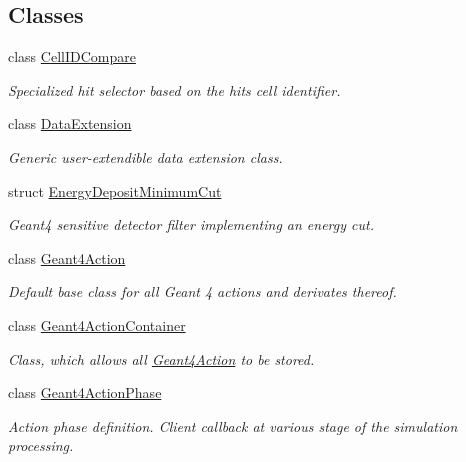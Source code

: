 \subsection*{Classes}
\begin{DoxyCompactItemize}
\item 
class \hyperlink{class_d_d4hep_1_1_simulation_1_1_cell_i_d_compare}{Cell\+I\+D\+Compare}
\begin{DoxyCompactList}\small\item\em Specialized hit selector based on the hit\textquotesingle{}s cell identifier. \end{DoxyCompactList}\item 
class \hyperlink{class_d_d4hep_1_1_simulation_1_1_data_extension}{Data\+Extension}
\begin{DoxyCompactList}\small\item\em Generic user-\/extendible data extension class. \end{DoxyCompactList}\item 
struct \hyperlink{struct_d_d4hep_1_1_simulation_1_1_energy_deposit_minimum_cut}{Energy\+Deposit\+Minimum\+Cut}
\begin{DoxyCompactList}\small\item\em Geant4 sensitive detector filter implementing an energy cut. \end{DoxyCompactList}\item 
class \hyperlink{class_d_d4hep_1_1_simulation_1_1_geant4_action}{Geant4\+Action}
\begin{DoxyCompactList}\small\item\em Default base class for all Geant 4 actions and derivates thereof. \end{DoxyCompactList}\item 
class \hyperlink{class_d_d4hep_1_1_simulation_1_1_geant4_action_container}{Geant4\+Action\+Container}
\begin{DoxyCompactList}\small\item\em Class, which allows all \hyperlink{class_d_d4hep_1_1_simulation_1_1_geant4_action}{Geant4\+Action} to be stored. \end{DoxyCompactList}\item 
class \hyperlink{class_d_d4hep_1_1_simulation_1_1_geant4_action_phase}{Geant4\+Action\+Phase}
\begin{DoxyCompactList}\small\item\em Action phase definition. Client callback at various stage of the simulation processing. \end{DoxyCompactList}\item 

\end{DoxyCompactItemize}
